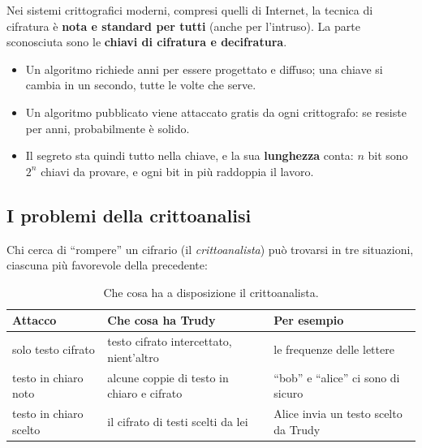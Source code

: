 Nei sistemi crittografici moderni, compresi quelli di Internet, la tecnica di cifratura è \textbf{nota e standard per tutti} (anche per
l'intruso). La parte sconosciuta sono le \textbf{chiavi di cifratura e decifratura}.



\begin{itemize}
    \item Un algoritmo richiede anni per essere progettato e diffuso; una chiave si cambia in un secondo, tutte le volte che serve.
    \item Un algoritmo pubblicato viene attaccato gratis da ogni crittografo: se resiste per anni, probabilmente è solido.
    \item Il segreto sta quindi tutto nella chiave, e la sua \textbf{lunghezza} conta: $n$ bit sono $2^n$ chiavi da provare, e ogni bit in
          più raddoppia il lavoro.
\end{itemize}

\subsection{I problemi della crittoanalisi}

Chi cerca di ``rompere'' un cifrario (il \emph{crittoanalista}) può trovarsi in tre situazioni, ciascuna più favorevole della
precedente:

\begin{table}[H]
\centering
\begin{tabular}{lll}
\toprule
\textbf{Attacco} & \textbf{Che cosa ha Trudy} & \textbf{Per esempio} \\
\midrule
solo testo cifrato & testo cifrato intercettato, nient'altro & le frequenze delle lettere \\
testo in chiaro noto & alcune coppie di testo in chiaro e cifrato & ``bob'' e ``alice'' ci sono di sicuro \\
testo in chiaro scelto & il cifrato di testi scelti da lei & Alice invia un testo scelto da Trudy \\
\bottomrule
\end{tabular}
\caption{Che cosa ha a disposizione il crittoanalista.}
\end{table}

